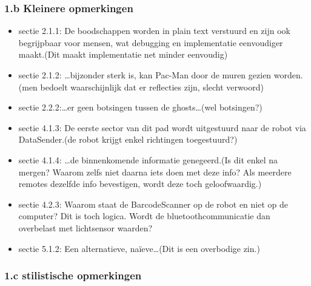 \documentclass[12pt,a4paper]{report}
\begin{document}
   \subsubsection{1.b Kleinere opmerkingen}

 
\begin{itemize}
	\item sectie 2.1.1: De boodschappen worden in plain text verstuurd en zijn ook begrijpbaar voor mensen, wat debugging en implementatie eenvoudiger maakt.(Dit maakt implementatie net minder eenvoudig)
	\item sectie 2.1.2: \ldots bijzonder sterk is, kan Pac-Man door de muren gezien worden.(men bedoelt waarschijnlijk dat er reflecties zijn, slecht verwoord)
	\item sectie 2.2.2:\ldots er geen botsingen tussen de ghosts\ldots(wel botsingen?)
	\item sectie 4.1.3: De eerste sector van dit pad wordt uitgestuurd naar de robot via DataSender.(de robot krijgt enkel richtingen toegestuurd?)
	\item sectie 4.1.4: \ldots de binnenkomende informatie genegeerd.(Is dit enkel na mergen? Waarom zelfs niet daarna iets doen met deze info? Als meerdere remotes dezelfde info bevestigen, wordt deze toch geloofwaardig.)
		\item sectie 4.2.3: Waarom staat de BarcodeScanner op de robot en niet op de computer? Dit is toch logica. Wordt de bluetoothcommunicatie dan overbelast met lichtsensor waarden? 
	\item sectie 5.1.2: Een alternatieve, na\"ieve\ldots(Dit is een overbodige zin.)
\end{itemize}

   \subsubsection{1.c stilistische opmerkingen}
\end{document}
